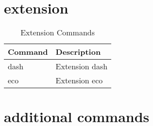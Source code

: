 \documentclass[openany, 12pt]{book}
\begin{document}
\chapter{extension}
\begin{table}[h]
	\centering
	\begin{tabular}{ll}
		\toprule
		\textbf{Command} & \textbf{Description} \\
		\midrule
		dash             & Extension dash       \\
		eco              & Extension eco        \\
		\bottomrule
	\end{tabular}
	\caption{Extension Commands}
\end{table}

\chapter{additional commands}
\end{document}
